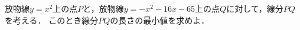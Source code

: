 \documentclass[../../main.tex]{subfiles}
\begin{document}
放物線$y=x^2$上の点$P$と，放物線$y=-x^2-16x-65$上の点$Q$に対して，線分$PQ$を考える．
このとき線分$PQ$の長さの最小値を求めよ．
\end{document}

